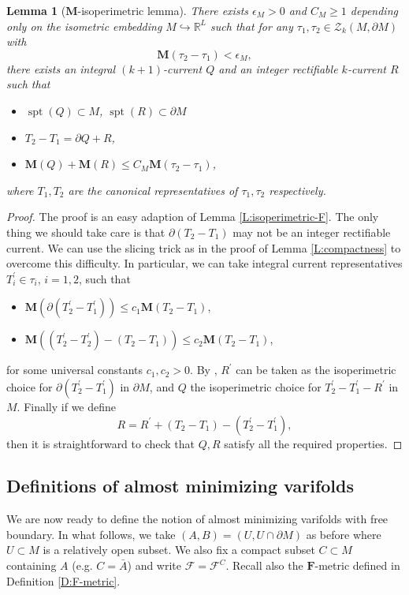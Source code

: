 \documentclass[10pt]{amsart}
\newtheorem{lemma}[theorem]{Lemma}
\theoremstyle{definition}
\theoremstyle{remark}
\numberwithin{equation}{section}
\newcommand{\R}{\mathbb{R}}
\newcommand{\F}{\mathcal{F}}
\newcommand{\ep}{\epsilon}
\newcommand{\pr}{\prime}
\newcommand{\Z}{\mathcal{Z}}
\newcommand{\M}{\mathbf{M}}
\newcommand{\mF}{\mathbf{F}}
\newcommand{\spt}{\operatorname{spt}}
\begin{document}
\begin{lemma}[$\M$-isoperimetric lemma]
\label{L:isoperimetric-M}
There exists $\ep_M>0$ and $C_M \geq 1$ depending only on the isometric embedding $M \hookrightarrow \R^L$ such that for any $\tau_1, \tau_2\in \Z_k(M, \partial M)$ with 
\[ \M(\tau_2-\tau_1) < \ep_M,\]
there exists an integral $(k+1)$-current $Q$ and an integer rectifiable $k$-current $R$ such that
\begin{itemize}
\item $\spt(Q) \subset M$, $\spt(R) \subset \partial M$
\item $T_2-T_1=\partial Q+R$,
\item $\M(Q)+\M(R)\leq C_M \M (\tau_2-\tau_1)$,
\end{itemize}
where $T_1,T_2$ are the canonical representatives of $\tau_1,\tau_2$ respectively.
\end{lemma}

\begin{proof}
The proof is an easy adaption of Lemma \ref{L:isoperimetric-F}. The only thing we should take care is that $\partial (T_2-T_1)$ may not be an integer rectifiable current. We can use the slicing trick as in the proof of Lemma \ref{L:compactness} to overcome this difficulty. In particular, we can take integral current representatives $T^{\pr}_i \in \tau_i$, $i=1, 2$, such that 
\begin{itemize}
\item $\M (\partial(T^{\pr}_2-T^{\pr}_1))\leq c_1 \M(T_2-T_1)$, 
\item $\M ((T_2^{\pr}-T_2^{\pr})-(T_2-T_1))\leq c_2 \M(T_2-T_1)$,
\end{itemize}
for some universal constants $c_1, c_2>0$. By \cite[Corollary 1.14]{Almgren62}, $R^{\pr}$ can be taken as the isoperimetric choice for $\partial(T_2^{\pr}-T_1^{\pr})$ in $\partial M$, and $Q$ the isoperimetric choice for $T_2^{\pr}-T_1^{\pr}-R^{\pr}$ in $M$. Finally if we define 
\[ R=R^{\pr}+(T_2-T_1)-(T_2^{\pr}-T_1^{\pr}),\]
then it is straightforward to check that $Q, R$ satisfy all the required properties.
\end{proof}


\subsection{Definitions of almost minimizing varifolds}
\label{SS:Def-am-varifolds}

We are now ready to define the notion of almost minimizing varifolds with free boundary. In what follows, we take $(A,B)=(U, U \cap \partial M)$ as before where $U\subset M$ is a relatively open subset. We also fix a compact subset $C \subset M$ containing $A$ (e.g. $C=\bar{A}$) and write $\F=\F^C$. Recall also the $\mF$-metric defined in Definition \ref{D:F-metric}.
\end{document}

